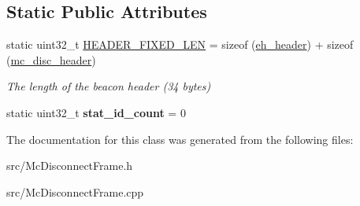 \subsection*{Static Public Attributes}
\begin{DoxyCompactItemize}
\item 
\hypertarget{classMcDisconnectFrame_a08982cfea8605de09ff9f90dc62f9f46}{static uint32\-\_\-t \hyperlink{classMcDisconnectFrame_a08982cfea8605de09ff9f90dc62f9f46}{H\-E\-A\-D\-E\-R\-\_\-\-F\-I\-X\-E\-D\-\_\-\-L\-E\-N} = sizeof (\hyperlink{structeh__header}{eh\-\_\-header}) + sizeof (\hyperlink{structmc__disc__header}{mc\-\_\-disc\-\_\-header})}\label{classMcDisconnectFrame_a08982cfea8605de09ff9f90dc62f9f46}

\begin{DoxyCompactList}\small\item\em The length of the beacon header (34 bytes) \end{DoxyCompactList}\item 
\hypertarget{classMcDisconnectFrame_a3a3b299a7161d1f4e232e74c159288ba}{static uint32\-\_\-t {\bfseries stat\-\_\-id\-\_\-count} = 0}\label{classMcDisconnectFrame_a3a3b299a7161d1f4e232e74c159288ba}

\end{DoxyCompactItemize}


The documentation for this class was generated from the following files\-:\begin{DoxyCompactItemize}
\item 
src/Mc\-Disconnect\-Frame.\-h\item 
src/Mc\-Disconnect\-Frame.\-cpp\end{DoxyCompactItemize}
